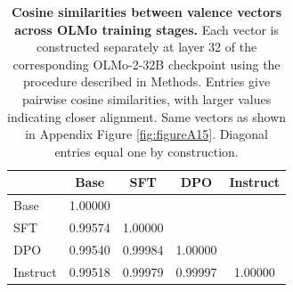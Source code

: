 \begin{table}[htbp]
\centering
\begin{tabular}{@{}lcccc@{}}
\toprule
 & Base & SFT & DPO & Instruct \\
\midrule
Base & 1.00000 & & & \\
SFT & 0.99574 & 1.00000 & & \\
DPO & 0.99540 & 0.99984 & 1.00000 & \\
Instruct & 0.99518 & 0.99979 & 0.99997 & 1.00000 \\
\bottomrule
\end{tabular}
\vspace{4pt}
\caption{\textbf{Cosine similarities between valence vectors across OLMo training stages.} Each vector is constructed separately at layer 32 of the corresponding OLMo-2-32B checkpoint using the procedure described in Methods. Entries give pairwise cosine similarities, with larger values indicating closer alignment. Same vectors as shown in Appendix Figure \ref{fig:figureA15}. Diagonal entries equal one by construction.}
\label{tab:olmo_valence_cosines}

\end{table}
